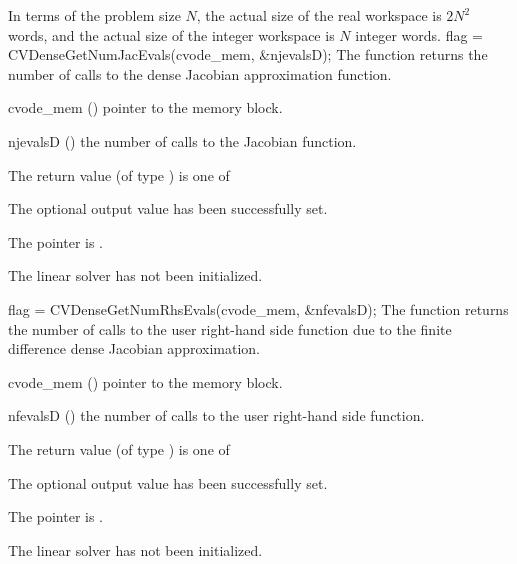 {
  In terms of the problem size $N$, the actual size of the real workspace
  is $2N^2$  words, and the actual size of the integer workspace
  is $N$ integer words.
}
{
  flag = CVDenseGetNumJacEvals(cvode\_mem, \&njevalsD);
}
{
  The function  returns the
  number of calls to the dense Jacobian approximation function.
}
{
  \begin{args}
  \item[cvode\_mem] ()
    pointer to the {\cvode} memory block.
  \item[njevalsD] ()
    the number of calls to the Jacobian function.
  \end{args}
}
{
  The return value  (of type ) is one of
  \begin{args}
  \item[\Id{CVDENSE\_SUCCESS}] 
    The optional output value has been successfully set.
  \item[\Id{CVDENSE\_MEM\_NULL}]
    The  pointer is .
  \item[\Id{CVDENSE\_LMEM\_NULL}]
    The {\cvdense} linear solver has not been initialized.
  \end{args}
}
{}
{
  flag = CVDenseGetNumRhsEvals(cvode\_mem, \&nfevalsD);
}
{
  The function  returns the
  number of calls to the user right-hand side function due to the 
  finite difference dense Jacobian approximation.
}
{
  \begin{args}
  \item[cvode\_mem] ()
    pointer to the {\cvode} memory block.
  \item[nfevalsD] ()
    the number of calls to the user right-hand side function.
  \end{args}
}
{
  The return value  (of type ) is one of
  \begin{args}
  \item[\Id{CVDENSE\_SUCCESS}] 
    The optional output value has been successfully set.
  \item[\Id{CVDENSE\_MEM\_NULL}]
    The  pointer is .
  \item[\Id{CVDENSE\_LMEM\_NULL}]
    The {\cvdense} linear solver has not been initialized.
  \end{args}
}
